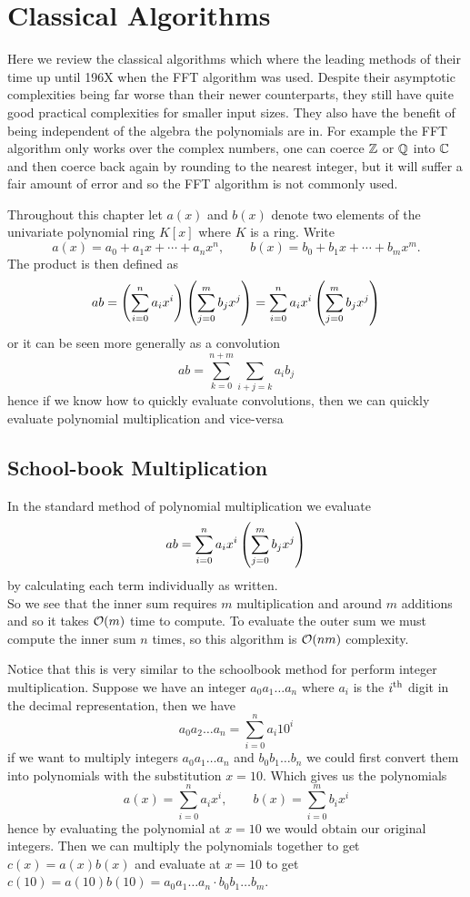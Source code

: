 \chapter{Classical Algorithms}\label{classical algorithms}

Here we review the classical algorithms which where the leading methods of their time up until 196X when the FFT algorithm was used. Despite their asymptotic complexities being far worse than their newer counterparts, they still have quite good practical complexities for smaller input sizes. They also have the benefit of being independent of the algebra the polynomials are in. For example the FFT algorithm only works over the complex numbers, one can coerce ${\mathbb Z}$ or ${\mathbb Q}$ into ${\mathbb C}$ and then coerce back again by rounding to the nearest integer, but it will suffer a fair amount of error and so the FFT algorithm is not commonly used.

Throughout this chapter let $a(x)$ and $b(x)$ denote two elements of the univariate polynomial ring $K[x]$ where $K$ is a ring.
Write
\[
    a(x) = a_0 + a_1x + \cdots + a_nx^n, \qquad b(x) = b_0 + b_1x + \cdots + b_mx^m.
\]
The product is then defined as
\[
    ab = \left(\sum^n_{i=0} a_i x^i\right)\left(\sum^m_{j=0} b_j x^j\right) = \sum^n_{i=0} a_ix^i\left(\sum^m_{j=0} b_j x^j\right)
\]
or it can be seen more generally as a convolution
\[
    ab = \sum^{n + m}_{k=0} \sum_{i + j = k}a_ib_j
\]
hence if we know how to quickly evaluate convolutions, then we can quickly evaluate polynomial multiplication and vice-versa

\section{School-book Multiplication}
\label{sec:prelim-schoolbook}

In the standard method of polynomial multiplication we evaluate
\[
    ab = \sum^n_{i=0} a_ix^i\left(\sum^m_{j=0} b_j x^j\right)
\]
by calculating each term individually as written.\\
So we see that the inner sum requires $m$ multiplication and around $m$ additions and so it takes $\mathcal O(m)$ time to compute. To evaluate the outer sum we must compute the inner sum $n$ times, so this algorithm is $\mathcal O(nm)$ complexity.

Notice that this is very similar to the schoolbook method for perform integer multiplication. Suppose we have an integer $a_0a_1 \ldots a_n$ where $a_i$ is the $i^\textrm{th}$ digit in the decimal representation, then we have
\[
    a_0a_2 \ldots a_n = \sum^n_{i=0} a_i 10^i
\]
if we want to multiply integers $a_0a_1\ldots a_n$ and $b_0b_1\ldots b_n$ we could first convert them into polynomials with the substitution $x = 10$. Which gives us the polynomials
\[
    a(x) = \sum^n_{i=0} a_ix^i, \qquad b(x) = \sum^m_{i=0} b_ix^i
\]
hence by evaluating the polynomial at $x = 10$ we would obtain our original integers. Then we can multiply the polynomials together to get $c(x) = a(x)b(x)$ and evaluate at $x = 10$ to get $c(10) = a(10)b(10) = a_0a_1\ldots a_n \cdot b_0b_1\ldots b_m$.

